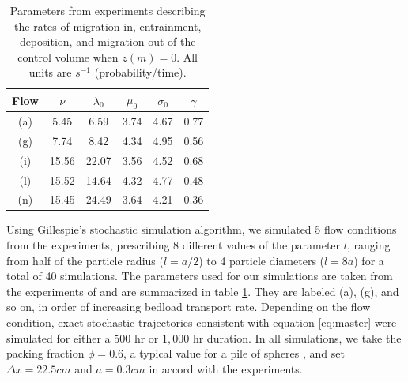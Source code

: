 \documentclass[draft]{agujournal2018}
\begin{document}
\begin{table}
\caption{Parameters from \citet{Ancey2008} experiments describing the rates of migration in, entrainment, deposition, and migration out of the control volume when $z(m)=0$. All units are $s^{-1}$ (probability/time).}\label{tab:anceyparams}
\begin{tabular}{cccccc} \\ 
\toprule  
Flow & $\nu$ & $\lambda_0$ & $\mu_0$ & $\sigma_0$ & $\gamma$ \\
\midrule
(a) & 5.45  & 6.59  & 3.74 & 4.67 & 0.77 \\
\midrule
(g) & 7.74  & 8.42  & 4.34 & 4.95 & 0.56 \\
\midrule
(i) & 15.56 & 22.07 & 3.56 & 4.52 & 0.68 \\
\midrule
(l) & 15.52 & 14.64 & 4.32 & 4.77 & 0.48 \\
\midrule
(n) & 15.45 & 24.49 & 3.64 & 4.21 & 0.36 \\
\bottomrule
\end{tabular}
\end{table} 
Using Gillespie's stochastic simulation algorithm, we simulated 5 flow conditions from the \citet{Ancey2008} experiments, prescribing 8 different values of the parameter $l$, ranging from half of the particle radius ($l=a/2$) to 4 particle diameters ($l=8a$) for a total of 40 simulations.
The parameters used for our simulations are taken from the experiments of \citet{Ancey2008} and are summarized in table \ref{tab:anceyparams}.
They are labeled (a), (g), and so on, in order of increasing bedload transport rate. 
Depending on the flow condition, exact stochastic trajectories consistent with equation \ref{eq:master} were simulated for either a $500$ hr or $1,000$ hr duration.
In all simulations, we take the packing fraction $\phi = 0.6$, a typical value for a pile of spheres \citep{Bennett1972}, and set $\Delta x = 22.5cm$ and $a = 0.3 cm$ in accord with the \citet{Ancey2008} experiments.
\end{document}
